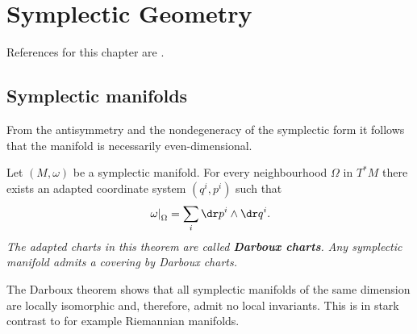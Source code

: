 \chapter{Symplectic Geometry}\label{chapter:symplectic}

    References for this chapter are \cite{mcduff, symplectic}.

\section{Symplectic manifolds}


    \begin{property}[Dimension]
        From the antisymmetry and the nondegeneracy of the symplectic form it follows that the manifold is necessarily even-dimensional.
    \end{property}

    \begin{theorem}[Darboux]
        Let $(M,\omega)$ be a symplectic manifold. For every neighbourhood $\Omega$ in $T^*M$ there exists an adapted coordinate system $(q^i,p^i)$ such that
        \begin{gather}
            \left.\omega\right|_\Omega = \sum_i\dr p^i\wedge\dr q^i.
        \end{gather}
        \emph{The adapted charts in this theorem are called \textbf{Darboux charts}. Any symplectic manifold admits a covering by Darboux charts.}
    \end{theorem}
    \begin{remark}
        The Darboux theorem shows that all symplectic manifolds of the same dimension are locally isomorphic and, therefore, admit no local invariants. This is in stark contrast to for example Riemannian manifolds.
    \end{remark}

